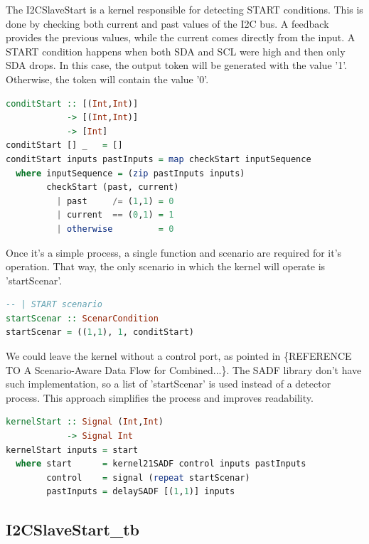 \documentclass{article}
\begin{document}
The I2CSlaveStart is a kernel responsible for detecting START conditions. This is done by checking both current and past values of the I2C bus. A feedback provides the previous values, while the current comes directly from the input.
A START condition happens when both SDA and SCL were high and then only SDA drops. In this case, the output token will be generated with the value '1'. Otherwise, the token will contain the value '0'.
\begin{lstlisting}[frame=single, basicstyle=\small, language={Haskell}, caption={START condition detector in Haskell}, captionpos=b, label={lst:behaviour}]
conditStart :: [(Int,Int)]
            -> [(Int,Int)]
            -> [Int]
conditStart [] _   = []
conditStart inputs pastInputs = map checkStart inputSequence
  where inputSequence = (zip pastInputs inputs)
        checkStart (past, current)
          | past     /= (1,1) = 0
          | current  == (0,1) = 1
          | otherwise         = 0
\end{lstlisting}

Once it's a simple process, a single function and scenario are required for it's operation. That way, the only scenario in which the kernel will operate is 'startScenar'.
\begin{lstlisting}[frame=single, basicstyle=\small, language={Haskell}, caption={Unique START condition scenario}, captionpos=b]
-- | START scenario
startScenar :: ScenarCondition
startScenar = ((1,1), 1, conditStart)
\end{lstlisting}

We could leave the kernel without a control port, as pointed in \{REFERENCE TO A Scenario-Aware Data Flow for Combined...\}. The SADF library don't have such implementation, so a list of 'startScenar' is used instead of a detector process. This approach simplifies the process and improves readability.
\begin{lstlisting}[frame=single, basicstyle=\small, language={Haskell}, caption={START condition kernel with constant scenario}, captionpos=b]
kernelStart :: Signal (Int,Int)
            -> Signal Int
kernelStart inputs = start
  where start      = kernel21SADF control inputs pastInputs
        control    = signal (repeat startScenar)
        pastInputs = delaySADF [(1,1)] inputs
\end{lstlisting}

\subsection{I2CSlaveStart\_tb}
\end{document}

